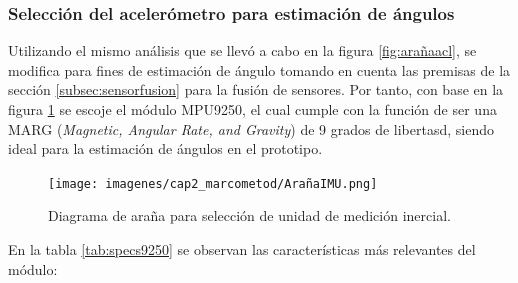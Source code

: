 \subsubsection{Selección del acelerómetro para estimación de ángulos}

Utilizando el mismo análisis que se llevó a cabo en la figura \ref{fig:arañaacl}, se modifica para fines de estimación de ángulo tomando en cuenta las premisas de la sección \ref{subsec:sensorfusion} para la fusión de sensores. Por tanto, con base en la figura \ref{fig:arañaimu} se escoje el módulo MPU9250, el cual cumple con la función de ser una MARG (\textit{Magnetic, Angular Rate, and Gravity}) de 9 grados de libertasd, siendo ideal para la estimación de ángulos en el prototipo.

\begin{figure}[H]
    \centering
    \texttt{[image: imagenes/cap2\_marcometod/ArañaIMU.png]}
    \caption{Diagrama de araña para selección de unidad de medición inercial.}
    \label{fig:arañaimu}
\end{figure}


En la tabla \ref{tab:specs9250} se observan las características más relevantes del módulo:

\begin{table}[H]
    \centering
    \caption{Especificaciones del MPU9250 de Invensense.}
    \label{tab:specs9250}
    \end{table}

